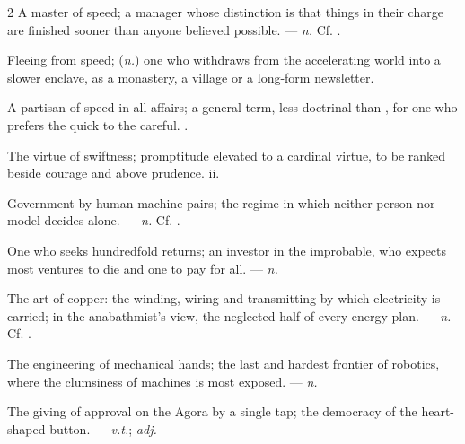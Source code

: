 \begin{multicols}{2}
 A master of speed; a manager whose distinction is that things in their charge are finished sooner than anyone believed possible. —  \textit{n.} Cf. .

 Fleeing from speed; (\textit{n.}) one who withdraws from the accelerating world into a slower enclave, as a monastery, a village or a long-form newsletter.

 A partisan of speed in all affairs; a general term, less doctrinal than , for one who prefers the quick to the careful. .

 The virtue of swiftness; promptitude elevated to a cardinal virtue, to be ranked beside courage and above prudence.   ii.

 Government by human-machine pairs; the regime in which neither person nor model decides alone. —  \textit{n.} Cf. .

 One who seeks hundredfold returns; an investor in the improbable, who expects most ventures to die and one to pay for all. —  \textit{n.}

 The art of copper: the winding, wiring and transmitting by which electricity is carried; in the anabathmist's view, the neglected half of every energy plan.  —  \textit{n.} Cf. .

 The engineering of mechanical hands; the last and hardest frontier of robotics, where the clumsiness of machines is most exposed. —  \textit{n.}

 The giving of approval on the Agora by a single tap; the democracy of the heart-shaped button. —  \textit{v.t.};  \textit{adj.}


\end{multicols}
